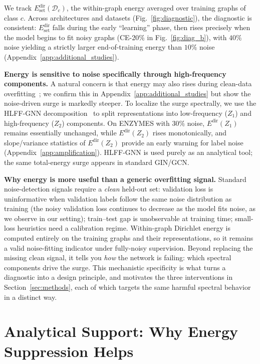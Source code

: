 \documentclass{article}
\theoremstyle{definition}
\newcommand{\Edir}{E^{\text{dir}}}
\newcommand{\Edirset}{E^{\text{dir}}_{\text{set}}}
\begin{document}
We track $\Edirset(\mathcal{D}_c)$, the within-graph energy averaged over training graphs of class $c$. Across architectures and datasets (Fig.~\ref{fig:diagnostic}), the diagnostic is consistent: $\Edirset$ falls during the early ``learning'' phase, then rises precisely when the model begins to fit noisy graphs (CE-20\% in Fig.~\ref{fig:diag_b}), with $40\%$ noise yielding a strictly larger end-of-training energy than $10\%$ noise (Appendix~\ref{app:additional_studies}).

\textbf{Energy is sensitive to noise specifically through high-frequency components.} A natural concern is that energy may also rises during clean-data overfitting~\citep{2sides}; we confirm this in Appendix~\ref{app:additional_studies} but show the noise-driven surge is markedly steeper. To localize the surge spectrally, we use the HLFF-GNN decomposition~\citep{hlffgnn} to split representations into low-frequency ($Z_1$) and high-frequency ($Z_2$) components. On ENZYMES with $30\%$ noise, $\Edir(Z_1)$ remains essentially unchanged, while $\Edir(Z_2)$ rises monotonically, and slope/variance statistics of $\Edir(Z_2)$ provide an early warning for label noise (Appendix~\ref{app:amplification}). HLFF-GNN is used purely as an analytical tool; the same total-energy surge appears in standard GIN/GCN.

\textbf{Why energy is more useful than a generic overfitting signal.} Standard noise-detection signals require a \emph{clean} held-out set: validation loss is uninformative when validation labels follow the same noise distribution as training (the noisy validation loss continues to decrease as the model fits noise, as we observe in our setting); train--test gap is unobservable at training time; small-loss heuristics need a calibration regime. Within-graph Dirichlet energy is computed entirely on the training graphs and their representations, so it remains a valid noise-fitting indicator under fully-noisy supervision. Beyond replacing the missing clean signal, it tells you \emph{how} the network is failing: which spectral components drive the surge. This mechanistic specificity is what turns a diagnostic into a design principle, and motivates the three interventions in Section~\ref{sec:methods}, each of which targets the same harmful spectral behavior in a distinct way.

\section{Analytical Support: Why Energy Suppression Helps}
\label{sec:theory}
\end{document}

